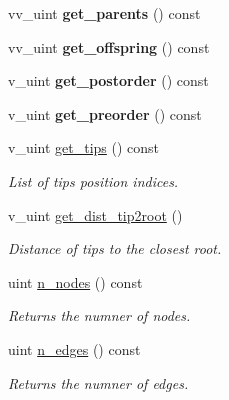 \begin{DoxyCompactItemize}
vv\+\_\+uint {\bfseries get\+\_\+parents} () const
\item 
\mbox{\label{classTree_ab8b6aa9cc84d3de0582172ecbea54a23}} 
vv\+\_\+uint {\bfseries get\+\_\+offspring} () const
\item 
\mbox{\label{classTree_adb69ae6c833c514826d83a1c44e51c7e}} 
v\+\_\+uint {\bfseries get\+\_\+postorder} () const
\item 
\mbox{\label{classTree_aebbe5baddde16ff29c390c9143a93f53}} 
v\+\_\+uint {\bfseries get\+\_\+preorder} () const
\item 
\mbox{\label{classTree_a18ef829dbc4ea232e55a0235c3e129d9}} 
v\+\_\+uint \hyperlink{classTree_a18ef829dbc4ea232e55a0235c3e129d9}{get\+\_\+tips} () const
\begin{DoxyCompactList}\small\item\em List of tips position indices. \end{DoxyCompactList}\item 
\mbox{\label{classTree_aba037bc726722c2742062e22243339ce}} 
v\+\_\+uint \hyperlink{classTree_aba037bc726722c2742062e22243339ce}{get\+\_\+dist\+\_\+tip2root} ()
\begin{DoxyCompactList}\small\item\em Distance of tips to the closest root. \end{DoxyCompactList}\item 
\mbox{\label{classTree_acd7173ad9bda225c0a96fca32e34e793}} 
uint \hyperlink{classTree_acd7173ad9bda225c0a96fca32e34e793}{n\+\_\+nodes} () const
\begin{DoxyCompactList}\small\item\em Returns the numner of nodes. \end{DoxyCompactList}\item 
\mbox{\label{classTree_ad58e38d600b6be674b5d5d903b0f8a74}} 
uint \hyperlink{classTree_ad58e38d600b6be674b5d5d903b0f8a74}{n\+\_\+edges} () const
\begin{DoxyCompactList}\small\item\em Returns the numner of edges. \end{DoxyCompactList}\item 

\end{DoxyCompactItemize}
